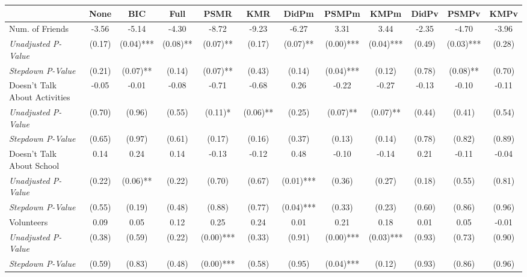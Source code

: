 \begin{tabular}{l c c c c c c c c c c c}
\toprule
 & None & BIC & Full & PSMR & KMR & DidPm & PSMPm & KMPm & DidPv & PSMPv & KMPv \\
\midrule
Num. of Friends & -3.56 & -5.14 & -4.30 & -8.72 & -9.23 & -6.27 & 3.31 & 3.44 & -2.35 & -4.70 & -3.96 \\
\quad \textit{Unadjusted P-Value} & (0.17) & (0.04)*** & (0.08)** & (0.07)** & (0.17) & (0.07)** & (0.00)*** & (0.04)*** & (0.49) & (0.03)*** & (0.28) \\
\quad \textit{Stepdown P-Value} & (0.21) & (0.07)** & (0.14) & (0.07)** & (0.43) & (0.14) & (0.04)*** & (0.12) & (0.78) & (0.08)** & (0.70) \\
Doesn't Talk About Activities & -0.05 & -0.01 & -0.08 & -0.71 & -0.68 & 0.26 & -0.22 & -0.27 & -0.13 & -0.10 & -0.11 \\
\quad \textit{Unadjusted P-Value} & (0.70) & (0.96) & (0.55) & (0.11)* & (0.06)** & (0.25) & (0.07)** & (0.07)** & (0.44) & (0.41) & (0.54) \\
\quad \textit{Stepdown P-Value} & (0.65) & (0.97) & (0.61) & (0.17) & (0.16) & (0.37) & (0.13) & (0.14) & (0.78) & (0.82) & (0.89) \\
Doesn't Talk About School & 0.14 & 0.24 & 0.14 & -0.13 & -0.12 & 0.48 & -0.10 & -0.14 & 0.21 & -0.11 & -0.04 \\
\quad \textit{Unadjusted P-Value} & (0.22) & (0.06)** & (0.22) & (0.70) & (0.67) & (0.01)*** & (0.36) & (0.27) & (0.18) & (0.55) & (0.81) \\
\quad \textit{Stepdown P-Value} & (0.55) & (0.19) & (0.48) & (0.88) & (0.77) & (0.04)*** & (0.33) & (0.23) & (0.60) & (0.86) & (0.96) \\
Volunteers & 0.09 & 0.05 & 0.12 & 0.25 & 0.24 & 0.01 & 0.21 & 0.18 & 0.01 & 0.05 & -0.01 \\
\quad \textit{Unadjusted P-Value} & (0.38) & (0.59) & (0.22) & (0.00)*** & (0.33) & (0.91) & (0.00)*** & (0.03)*** & (0.93) & (0.73) & (0.90) \\
\quad \textit{Stepdown P-Value} & (0.59) & (0.83) & (0.48) & (0.00)*** & (0.58) & (0.95) & (0.04)*** & (0.12) & (0.93) & (0.86) & (0.96) \\
\bottomrule
\end{tabular}
